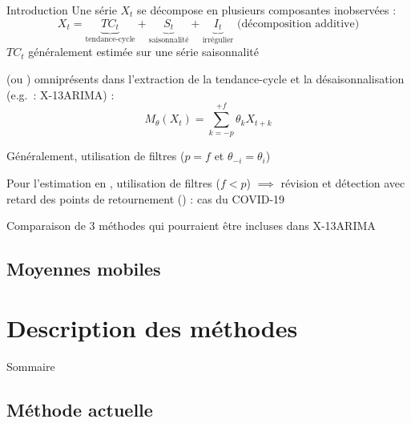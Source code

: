 \documentclass[10pt,xcolor=table,color={dvipsnames,usenames},ignorenonframetext,usepdftitle=false,french]{beamer}
\newcommand\1{\mathds{1}}
\begin{document}
\begin{frame}{Introduction}
\protect\hypertarget{introduction-1}{}
Une série \(X_t\) se décompose en plusieurs composantes inobservées : \[
X_t=\underbrace{TC_t}_{\text{tendance-cycle}}+
\underbrace{S_t}_{\text{saisonnalité}}+
\underbrace{I_t}_{\text{irrégulier}}\text{ (décomposition additive)}
\] \(TC_t\) généralement estimée sur une série 
saisonnalité

\pause

 (ou )
omniprésents dans l'extraction de la tendance-cycle et la
désaisonnalisation (e.g.~: X-13ARIMA) : \[
M_\theta(X_t)=\sum_{k=-p}^{+f}\theta_kX_{t+k}
\]

\pause

\faArrowCircleRight{} Généralement, utilisation de filtres
 (\(p=f\) et \(\theta_{-i}=\theta_i\))

\pause

\faArrowCircleRight{} Pour l'estimation en ,
utilisation de filtres  (\(f<p\)) \(\implies\)
révision et détection avec retard des points de retournement
() : cas du COVID-19

\pause

\faArrowCircleRight{} Comparaison de 3 méthodes qui pourraient être
incluses dans X-13ARIMA
\end{frame}

\hypertarget{moyennes-mobiles}{%
\subsection{Moyennes mobiles}\label{moyennes-mobiles}}

\hypertarget{description-des-muxe9thodes}{%
\section{Description des méthodes}\label{description-des-muxe9thodes}}

\begin{frame}{Sommaire}
\protect\hypertarget{sommaire}{}
\end{frame}

\hypertarget{muxe9thode-actuelle}{%
\subsection{Méthode actuelle}\label{muxe9thode-actuelle}}
\end{document}

